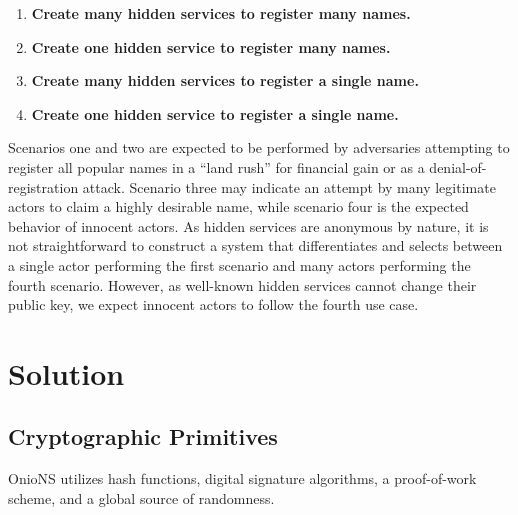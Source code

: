 \documentclass[USenglish,oneside,twocolumn]{article}
\begin{document}
\begin{enumerate}
	\item \textbf{Create many hidden services to register many names.}
	\item \textbf{Create one hidden service to register many names.}
	\item \textbf{Create many hidden services to register a single name.}
	\item \textbf{Create one hidden service to register a single name.}
\end{enumerate}

Scenarios one and two are expected to be performed by adversaries attempting to register all popular names in a ``land rush'' for financial gain or as a denial-of-registration attack. Scenario three may indicate an attempt by many legitimate actors to claim a highly desirable name, while scenario four is the expected behavior of innocent actors. As hidden services are anonymous by nature, it is not straightforward to construct a system that differentiates and selects between a single actor performing the first scenario and many actors performing the fourth scenario. However, as well-known hidden services cannot change their public key, we expect innocent actors to follow the fourth use case.

\section{Solution}
\label{sec:Solution}

\subsection{Cryptographic Primitives}
\label{sec:cryptoPrimitives}

OnioNS utilizes hash functions, digital signature algorithms, a proof-of-work scheme, and a global source of randomness.
\end{document}
